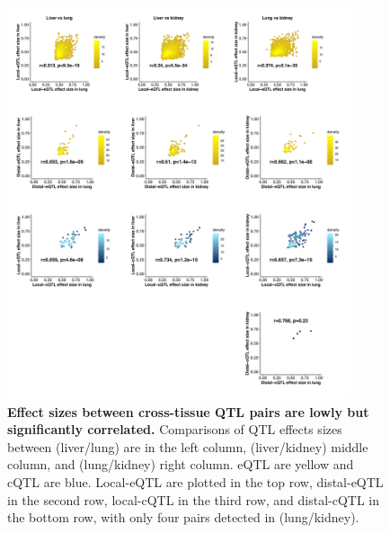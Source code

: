 \documentclass[9pt,twocolumn,twoside]{gsajnl}
\begin{document}
\clearpage

\begin{figure}[hp]
\renewcommand{\familydefault}{\sfdefault}\normalfont
\centering
\includegraphics[width=0.9\textwidth, trim={0in 0in 0in 0in}, clip]{figs/effect_size_by_effect_size.pdf}
\caption{\textbf{Effect sizes between cross-tissue QTL pairs are lowly but significantly correlated.} 
Comparisons of QTL effects sizes between (liver/lung) are in the left column, (liver/kidney) middle column, and (lung/kidney) right column. eQTL are yellow and cQTL are blue. Local-eQTL are plotted in the top row, distal-eQTL in the second row, local-cQTL in the third row, and distal-cQTL in the bottom row, with only four pairs detected in (lung/kidney). 
\label{fig:qtl_effect_size_comparison}}
\end{figure}

\clearpage
\end{document}
